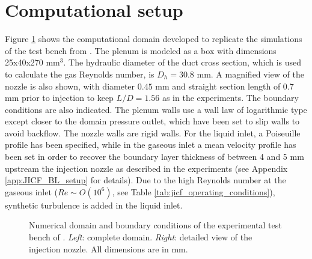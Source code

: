 \section{Computational setup}
	\label{sec:computational_setup}


Figure \ref{fig:numerical_setup_maquette_JICF_DLR} shows the computational domain developed to replicate the simulations of the test bench from . The plenum is modeled as a box with dimensions 25x40x270 mm$^3$. The hydraulic diameter of the duct cross section, which is used to calculate the gas Reynolds number, is $D_h = 30.8$ mm. A magnified view of the nozzle is also shown, with diameter $0.45$ mm and straight section length of 0.7 mm prior to injection to keep $L/D = 1.56$ as in the experiments. The boundary conditions are also indicated. The plenum walls use a wall law of logarithmic type except closer to the domain pressure outlet, which have been set to slip walls to avoid backflow. The nozzle walls are rigid walls. For the liquid inlet, a Poiseuille profile has been specified, while in the gaseous inlet a mean velocity profile has been set in order to recover the boundary layer thickness of between 4 and 5 mm upstream the injection nozzle as described in the experiments (see Appendix \ref{app:JICF_BL_setup} for details). Due to the high Reynolds number at the gaseous inlet ($Re \sim O \left( 10^6 \right)$, see Table \ref{tab:jicf_operating_conditions}), synthetic turbulence is added in the liquid inlet.

\begin{figure}[ht]
     \centering
      \caption{Numerical domain and boundary conditions of the experimental test bench of . \textsl{Left}: complete domain. \textsl{Right}: detailed view of the injection nozzle. All dimensions are in mm.}
      \label{fig:numerical_setup_maquette_JICF_DLR}
\end{figure}


